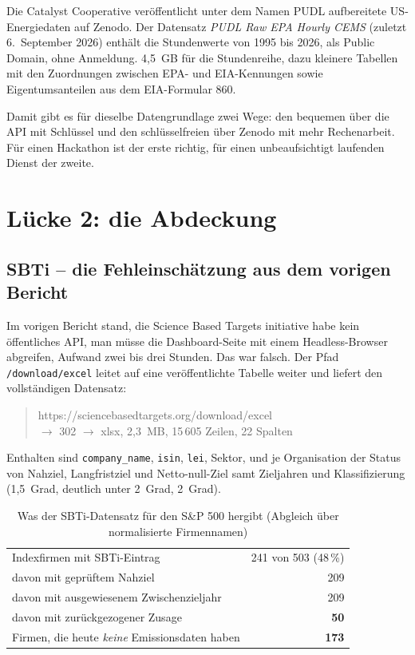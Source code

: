 \documentclass[11pt,a4paper]{article}
\begin{document}
Die Catalyst Cooperative veröffentlicht unter dem Namen PUDL aufbereitete US-Energiedaten auf Zenodo. Der Datensatz \emph{PUDL Raw EPA Hourly CEMS} (zuletzt 6.~September 2026) enthält die Stundenwerte von 1995 bis 2026, als Public Domain, ohne Anmeldung. 4{,}5~GB für die Stundenreihe, dazu kleinere Tabellen mit den Zuordnungen zwischen EPA- und EIA-Kennungen sowie Eigentumsanteilen aus dem EIA-Formular 860.

Damit gibt es für dieselbe Datengrundlage zwei Wege: den bequemen über die API mit Schlüssel und den schlüsselfreien über Zenodo mit mehr Rechenarbeit. Für einen Hackathon ist der erste richtig, für einen unbeaufsichtigt laufenden Dienst der zweite.

\section{Lücke 2: die Abdeckung}

\subsection{SBTi -- die Fehleinschätzung aus dem vorigen Bericht}

Im vorigen Bericht stand, die Science Based Targets initiative habe kein öffentliches API, man müsse die Dashboard-Seite mit einem Headless-Browser abgreifen, Aufwand zwei bis drei Stunden. Das war falsch. Der Pfad \texttt{/download/excel} leitet auf eine veröffentlichte Tabelle weiter und liefert den vollständigen Datensatz:

\begin{quote}\footnotesize\ttfamily
https://sciencebasedtargets.org/download/excel \\
$\rightarrow$ 302 $\rightarrow$ xlsx, 2{,}3~MB, 15\,605 Zeilen, 22 Spalten
\end{quote}

Enthalten sind \texttt{company\_name}, \texttt{isin}, \texttt{lei}, Sektor, und je Organisation der Status von Nahziel, Langfristziel und Netto-null-Ziel samt Zieljahren und Klassifizierung (1{,}5~Grad, deutlich unter 2~Grad, 2~Grad).

\begin{table}[htbp]
\centering\small
\caption{Was der SBTi-Datensatz für den S\&P 500 hergibt (Abgleich über normalisierte Firmennamen)}
\label{tab:sbti}
\begin{tabular}{lr}
\toprule
Indexfirmen mit SBTi-Eintrag & 241 von 503 (48\,\%) \\
davon mit geprüftem Nahziel & 209 \\
davon mit ausgewiesenem Zwischenzieljahr & 209 \\
davon mit zurückgezogener Zusage & \textbf{50} \\
Firmen, die heute \emph{keine} Emissionsdaten haben & \textbf{173} \\
\bottomrule
\end{tabular}
\end{table}
\end{document}
